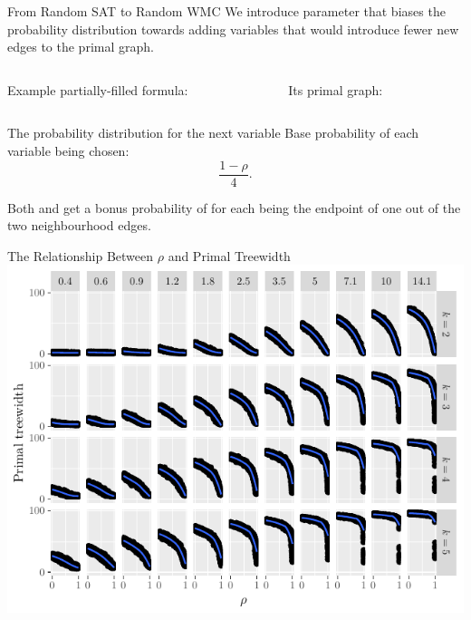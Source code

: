 \documentclass{beamer}
\begin{document}
\begin{frame}{From Random SAT to Random WMC}
  We introduce parameter \structure{$\rho \in [0, 1]$} that biases the
  probability distribution towards adding variables that would introduce fewer
  new edges to the primal graph.

  \vfill
  \begin{columns}[t]
    \begin{column}{0.5\linewidth}
      Example partially-filled formula:
    \end{column}
    \begin{column}{0.4\linewidth}
      Its primal graph:

    \end{column}
  \end{columns}

  \begin{block}{The probability distribution for the next variable}
    Base probability of each variable being chosen:
    \[
      \frac{1 - \rho}{4}.
    \]

    Both  and  get a bonus probability of
     for each being the endpoint of \alert{one} out of
    the \alert{two} neighbourhood edges.
  \end{block}
\end{frame}

\begin{frame}{The Relationship Between \alert{$\rho$} and Primal Treewidth}
  \includegraphics{regular_repetitiveness.pdf}
\end{frame}
\end{document}
